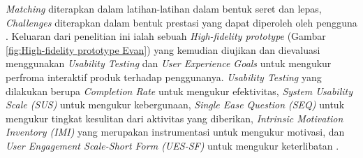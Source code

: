 \textit{Matching} diterapkan dalam latihan-latihan dalam bentuk seret dan lepas,
\textit{Challenges} diterapkan dalam bentuk prestasi yang dapat diperoleh oleh pengguna \cite{GamificationInProgLang}.
Keluaran dari penelitian ini ialah sebuah \textit{High-fidelity prototype} (Gambar \ref*{fig:High-fidelity prototype Evan}) yang kemudian diujikan dan dievaluasi menggunakan \textit{Usability Testing} dan \textit{User Experience Goals} untuk mengukur perfroma interaktif produk terhadap penggunanya.
\textit{Usability Testing} yang dilakukan berupa \textit{Completion Rate} untuk mengukur efektivitas, \textit{System Usability Scale (SUS)} untuk mengukur kebergunaan,
\textit{Single Ease Question (SEQ)} untuk mengukur tingkat kesulitan dari aktivitas yang diberikan, \textit{Intrinsic Motivation Inventory (IMI)} yang merupakan instrumentasi untuk mengukur motivasi,
dan \textit{User Engagement Scale-Short Form (UES-SF)} untuk mengukur keterlibatan \cite{GamificationInProgLang}.

